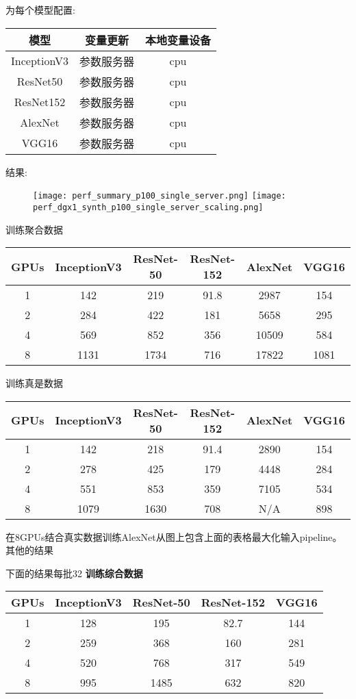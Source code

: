 为每个模型配置:
\begin{table}[H]
	\centering
	\begin{tabular}{|c|c|c|}
		\hline
	模型&变量更新&本地变量设备\\
		\hline
		InceptionV3 &参数服务器&cpu\\
		\hline
		ResNet50 &参数服务器&cpu\\
		\hline
		ResNet152 &参数服务器&cpu\\
		\hline
		AlexNet &参数服务器&cpu\\
		\hline
		VGG16 &参数服务器&cpu\\
		\hline
	\end{tabular}
\end{table}
结果:
\begin{figure}[H]
	\texttt{[image: perf\_summary\_p100\_single\_server.png]}
	\texttt{[image: perf\_dgx1\_synth\_p100\_single\_server\_scaling.png]}
\end{figure}
训练聚合数据
\begin{table}[H]
	\centering
	\begin{tabular}{|c|c|c|c|c|c|}
		\hline
		GPUs	&InceptionV3	&ResNet-50	&ResNet-152	&AlexNet	&VGG16\\
		\hline
		1	&142	&219	&91.8	&2987	&154\\
		\hline
		2	&284	&422	&181	&5658	&295\\
		\hline
		4	&569	&852	&356	&10509	&584\\
		\hline
		8	&1131	&1734	&716	&17822	&1081\\
		\hline
	\end{tabular}
\end{table}
训练真是数据
\begin{table}[H]
	\centering
	\begin{tabular}{|c|c|c|c|c|c|}
		\hline
		GPUs	&InceptionV3	&ResNet-50	&ResNet-152	&AlexNet	&VGG16\\
		\hline
		1	&142	&218	&91.4	&2890	&154\\
		\hline
		2	&278	&425	&179	&4448	&284\\
		\hline
		4	&551	&853	&359	&7105	&534\\
		\hline
		8	&1079	&1630	&708	&N/A	&898\\
		\hline
	\end{tabular}
\end{table}
在8GPUs结合真实数据训练AlexNet从图上包含上面的表格最大化输入pipeline。
其他的结果

下面的结果每批32
\textbf{训练综合数据}
\begin{table}[H]
	\centering
	\begin{tabular}{|c|c|c|c|c|}
		\hline
		GPUs	&InceptionV3	&ResNet-50	&ResNet-152	&VGG16\\
		\hline
		1	&128	&195	&82.7	&144\\
		\hline
		2	&259	&368	&160	&281\\
		\hline
		4	&520	&768	&317	&549\\
		\hline
		8	&995	&1485	&632	&820\\
		\hline
	\end{tabular}
\end{table}

